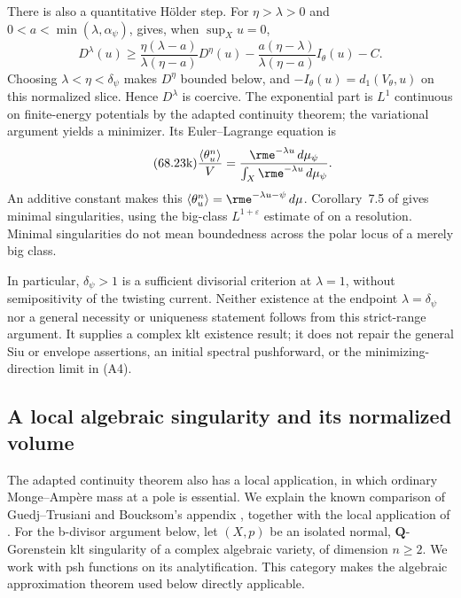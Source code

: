 There is also a quantitative H\"older step. For
$\eta>\lambda>0$ and $0<a<\min(\lambda,\alpha_\psi)$,
\cite[Lemma~7.4]{DarvasZhang26KltV2} gives, when $\sup_Xu=0$,
\[
\tag{68.23j}\label{eq:ytd-klt-holder-coercivity}
 D^\lambda(u)\geq
 \frac{\eta(\lambda-a)}{\lambda(\eta-a)}D^\eta(u)
 -\frac{a(\eta-\lambda)}{\lambda(\eta-a)}I_\theta(u)-C.
\]
Choosing $\lambda<\eta<\delta_\psi$ makes $D^\eta$ bounded
below, and $-I_\theta(u)=d_1(V_\theta,u)$ on this normalized
slice. Hence $D^\lambda$ is coercive. The exponential part is
$L^1$ continuous on finite-energy potentials by the adapted
continuity theorem; the variational argument yields a minimizer.
Its Euler--Lagrange equation is
\[
\tag{68.23k}\label{eq:ytd-klt-ke-equation}
 \frac{\left\langle\theta_u^n\right\rangle}{V}
 =\frac{\rme^{-\lambda u}\,d\mu_\psi}
        {\int_X\rme^{-\lambda u}\,d\mu_\psi}.
\]
An additive constant makes this
$\left\langle\theta_u^n\right\rangle
 =\rme^{-\lambda u-\psi}\,d\mu$.
Corollary~7.5 of \cite{DarvasZhang26KltV2} gives minimal
singularities, using the big-class $L^{1+\varepsilon}$ estimate
of \cite[Theorem~B]{BEGZ10BigV2} on a resolution.
Minimal singularities do not mean boundedness across the polar
locus of a merely big class.

In particular, $\delta_\psi>1$ is a sufficient divisorial
criterion at $\lambda=1$, without semipositivity of the twisting
current. Neither existence at the endpoint $\lambda=\delta_\psi$
nor a general necessity or uniqueness statement follows from this
strict-range argument. It supplies a complex klt existence result;
it does not repair the general Siu or envelope assertions, an
initial spectral pushforward, or the minimizing-direction limit
in (A4).

\subsection{A local algebraic singularity and its normalized volume}
\label{sec:ytd-local-klt-volume}

The adapted continuity theorem also has a local application, in which
ordinary Monge--Amp\`ere mass at a pole is essential. We explain the
known comparison of Guedj--Trusiani and Boucksom's appendix
\cite{GuedjTrusiani25LocalPublished}, together with the local application
of \cite[Section~8]{DarvasZhang26KltV2}. For the b-divisor argument
below, let $(X,p)$ be an isolated normal, $\mathbf Q$-Gorenstein klt
singularity of a complex algebraic variety, of dimension $n\geq2$.
We work with psh functions on its analytification. This category makes
the algebraic approximation theorem used below directly applicable.

